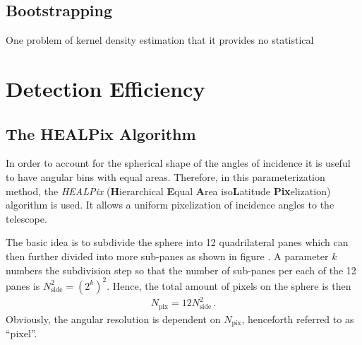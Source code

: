 \subsection{Bootstrapping}
One problem of kernel density estimation that it provides no statistical 

\section{Detection Efficiency}

\subsection{The HEALPix Algorithm}

In order to account for the spherical shape of the angles of incidence it is useful to have angular bins with equal areas. Therefore, in this parameterization method, the \textit{HEALPix} (\textbf{H}ierarchical \textbf{E}qual \textbf{A}rea iso\textbf{L}atitude \textbf{Pix}elization) algorithm is used. It allows a uniform pixelization of incidence angles to the telescope.\\


The basic idea is to subdivide the sphere into 12 quadrilateral panes which can then further divided into more sub-panes as shown in figure . A parameter $k$ numbers the subdivision step so that the number of sub-panes per each of the 12 panes is $N_{\text{side}}^2=\left(2^k\right)^2$. Hence, the total amount of pixels on the sphere is then
\begin{align}
N_\text{pix} = 12N_\text{side}^2\,.
\end{align}
Obviously, the angular resolution is dependent on $N_\text{pix}$, henceforth referred to as \enquote{pixel}.

